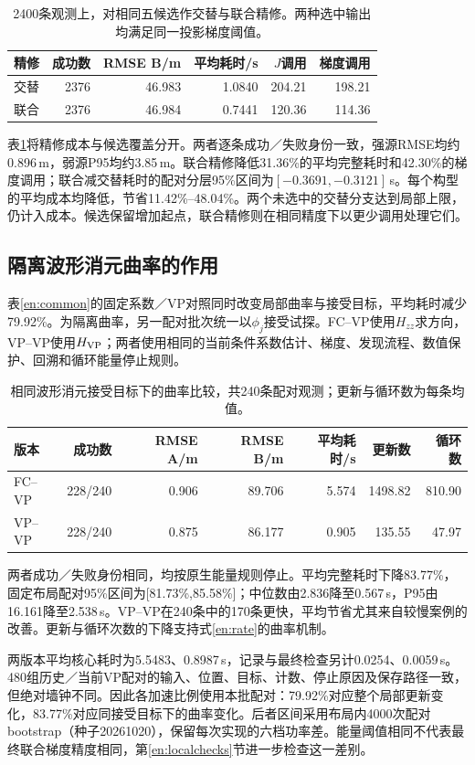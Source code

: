 \documentclass[a4paper,fleqn]{cas-sc}
\begin{document}
\begin{table}[pos=H]\centering\small
\caption{2400条观测上，对相同五候选作交替与联合精修。两种选中输出均满足同一投影梯度阈值。}\label{en:apjoint}
\begin{tabular}{@{}lrrrrr@{}}\toprule
精修 & 成功数 & RMSE B/m & 平均耗时/s & $J$调用 & 梯度调用\\\midrule
交替 & 2376 & 46.983 & 1.0840 & 204.21 & 198.21\\
联合 & 2376 & 46.984 & 0.7441 & 120.36 & 114.36\\\bottomrule
\end{tabular}\end{table}
表\ref{en:apjoint}将精修成本与候选覆盖分开。两者逐条成功／失败身份一致，强源RMSE均约0.896\,m，弱源P95均约3.85\,m。联合精修降低31.36\%的平均完整耗时和42.30\%的梯度调用；联合减交替耗时的配对分层95\%区间为$[-0.3691,-0.3121]$\,s。每个构型的平均成本均降低，节省11.42\%--48.04\%。两个未选中的交替分支达到局部上限，仍计入成本。候选保留增加起点，联合精修则在相同精度下以更少调用处理它们。

\FloatBarrier
\subsection{隔离波形消元曲率的作用}
表\ref{en:common}的固定系数／VP对照同时改变局部曲率与接受目标，平均耗时减少79.92\%。为隔离曲率，另一配对批次统一以$\phi_j$接受试探。FC--VP使用$H_{zz}$求方向，VP--VP使用$H_{\rm VP}$；两者使用相同的当前条件系数估计、梯度、发现流程、数值保护、回溯和循环能量停止规则。
\begin{table}[pos=H]\centering\small
\caption{相同波形消元接受目标下的曲率比较，共240条配对观测；更新与循环数为每条均值。}\label{en:curvaturetable}
\begin{tabular}{@{}lrrrrrr@{}}\toprule
版本 & 成功数 & RMSE A/m & RMSE B/m & 平均耗时/s & 更新数 & 循环数\\\midrule
FC--VP & 228/240 & 0.906 & 89.706 & 5.574 & 1498.82 & 810.90\\
VP--VP & 228/240 & 0.875 & 86.177 & 0.905 & 135.55 & 47.97\\\bottomrule
\end{tabular}\end{table}
两者成功／失败身份相同，均按原生能量规则停止。平均完整耗时下降83.77\%，固定布局配对95\%区间为[81.73\%,85.58\%]；中位数由2.836降至0.567\,s，P95由16.161降至2.538\,s。VP--VP在240条中的170条更快，平均节省尤其来自较慢案例的改善。更新与循环次数的下降支持式\eqref{en:rate}的曲率机制。

两版本平均核心耗时为5.5483、0.8987\,s，记录与最终检查另计0.0254、0.0059\,s。480组历史／当前VP配对的输入、位置、目标、计数、停止原因及保存路径一致，但绝对墙钟不同。因此各加速比例使用本批配对：79.92\%对应整个局部更新变化，83.77\%对应同接受目标下的曲率变化。后者区间采用布局内4000次配对bootstrap（种子20261020），保留每次实现的六档功率差。能量阈值相同不代表最终联合梯度精度相同，第\ref{en:localchecks}节进一步检查这一差别。
\end{document}
